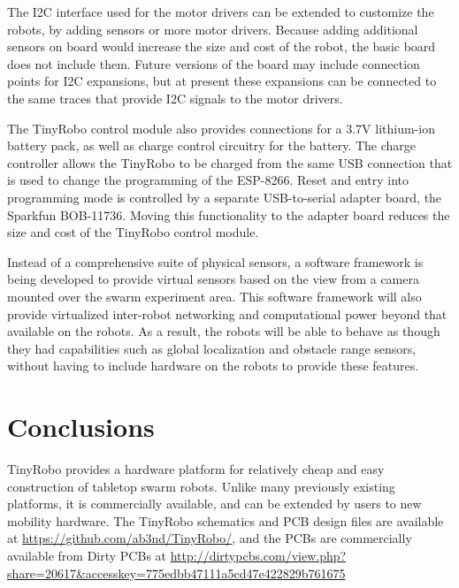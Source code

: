 \documentclass[letterpaper, 10 pt, conference]{ieeeconf}  %
\begin{document}
The I2C interface used for the motor drivers can be extended to customize the robots, by adding sensors or more motor drivers. 
Because adding additional sensors on board would increase the size and cost of the robot, the basic board does not include them. 
Future versions of the board may include connection points for I2C expansions, but at present these expansions can be connected to the same traces that provide I2C signals to the motor drivers. 

The TinyRobo control module also provides connections for a 3.7V lithium-ion battery pack, as well as charge control circuitry for the battery. 
The charge controller allows the TinyRobo to be charged from the same USB connection that is used to change the programming of the ESP-8266. 
Reset and entry into programming mode is controlled by a separate USB-to-serial adapter board, the Sparkfun BOB-11736.
Moving this functionality to the adapter board reduces the size and cost of the TinyRobo control module. 

Instead of a comprehensive suite of physical sensors, a software framework is being developed to provide virtual sensors based on the view from a camera mounted over the swarm experiment area.
This software framework will also provide virtualized inter-robot networking and computational power beyond that available on the robots. 
As a result, the robots will be able to behave as though they had capabilities such as global localization and obstacle range sensors, without having to include hardware on the robots to provide these features. 

\section{Conclusions}

TinyRobo provides a hardware platform for relatively cheap and easy construction of tabletop swarm robots.
Unlike many previously existing platforms, it is commercially available, and can be extended by users to new mobility hardware. 
The TinyRobo schematics and PCB design files are available at \url{https://github.com/ab3nd/TinyRobo/}, and the PCBs are commercially available from Dirty PCBs at \url{http://dirtypcbs.com/view.php?share=20617&accesskey=775edbb47111a5cd47e422829b761675}


\end{document}
